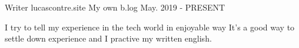 

\begin{cventries}

  \cventry
  {Writer} %
  {lucascontre.site} %
  {My own b.log} %
  {May. 2019 - PRESENT} %
  {
  \begin{cvitems} %
    \item {I try to tell my experience in the tech world in enjoyable way It's a good way to settle down experience and I practive my written english.}
  \end{cvitems}
  }


\end{cventries}
